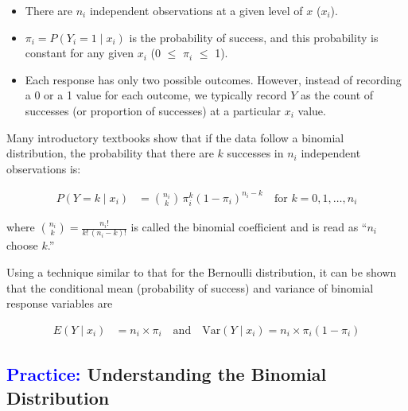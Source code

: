 \documentclass[
]{report}
\providecommand{\tightlist}{%
  \setlength{\itemsep}{0pt}\setlength{\parskip}{0pt}}
\begin{document}
\begin{itemize}
\tightlist
\item
  There are \(\scriptstyle n_i\) independent observations at a given level of \(\scriptstyle x\) (\(\scriptstyle x_i\)).
\item
  \(\scriptstyle \pi_i = P(Y_i = 1 \mid x_i)\) is the probability of success, and this probability is constant for any given \(\scriptstyle x_i\) (0 \(\scriptstyle \le\) \(\scriptstyle \pi_i\) \(\scriptstyle \le\) 1).
\item
  Each response has only two possible outcomes. However, instead of recording a 0 or a 1 value for each outcome, we typically record \(\scriptstyle Y\) as the count of successes (or proportion of successes) at a particular \(\scriptstyle x_i\) value.
\end{itemize}

Many introductory textbooks show that if the data follow a binomial distribution, the probability that there are \(\scriptstyle k\) successes in \(\scriptstyle n_i\) independent observations is:

\begin{align}
P(Y = k \mid x_i) &= \binom{n_i}{k} \,\pi_i^k (1 - \pi_i)^{n_i - k} \quad \text{for } k = 0, 1, \dots, n_i \tag{6.21}
\end{align}

where \(\displaystyle \binom{n_i}{k} = \frac{n_i!}{k!\,(n_i - k)!}\) is called the binomial coefficient and is read as ``\(\scriptstyle n_i\) choose \(\scriptstyle k\).''

Using a technique similar to that for the Bernoulli distribution, it can be shown that the conditional mean (probability of success) and variance of binomial response variables are

\begin{align}
E(Y \mid x_i) &= n_i \times \pi_i \quad \text{and} \quad \mathrm{Var}(Y \mid x_i) = n_i \times \pi_i (1 - \pi_i) 
\tag{6.22}
\end{align}

\hypertarget{understanding-the-binomial-distribution}{%
\subsection*{\texorpdfstring{\textcolor{blue}{Practice:} Understanding the Binomial Distribution}{ Understanding the Binomial Distribution}}\label{understanding-the-binomial-distribution}}
\end{document}
